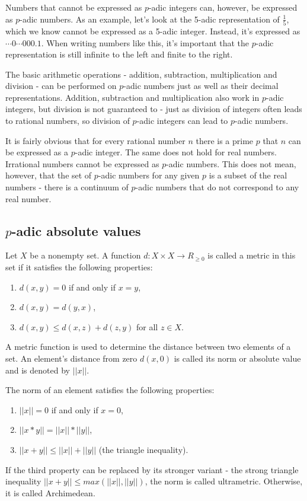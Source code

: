 \documentclass{llncs}
\begin{document}
Numbers that cannot be expressed as $p$-adic integers can, however, be expressed as $p$-adic numbers. As an example, let's look at the 5-adic representation of $\frac{1}{5}$, which we know cannot be expressed as a 5-adic integer. Instead, it's expressed as $\cdots 0 \cdots 000.1$. When writing numbers like this, it's important that the $p$-adic representation is still infinite to the left and finite to the right.

The basic arithmetic operations - addition, subtraction, multiplication and division - can be performed on $p$-adic numbers just as well as their decimal representations. Addition, subtraction and multiplication also work in $p$-adic integers, but division is not guaranteed to - just as division of integers often leads to rational numbers, so division of $p$-adic integers can lead to $p$-adic numbers.

It is fairly obvious that for every rational number $n$ there is a prime $p$ that $n$ can be expressed as a $p$-adic integer. The same does not hold for real numbers. Irrational numbers cannot be expressed as $p$-adic numbers. This does not mean, however, that the set of $p$-adic numbers for any given $p$ is a subset of the real numbers - there is a continuum of $p$-adic numbers that do not correspond to any real number. \cite{Rus12}
\subsection{$p$-adic absolute values}
Let $X$ be a nonempty set. A function $d: X \times X \rightarrow R_{\geq 0}$ is called a metric in this set if it satisfies the following properties:
\begin{enumerate}
\item $d(x,y) = 0$ if and only if $x = y$,\\
\item $d(x,y) = d(y,x)$,\\
\item $d(x,y) \leq d(x,z) + d(z,y)$ for all $z \in X$.
\end{enumerate}
A metric function is used to determine the distance between two elements of a set. An element's distance from zero $d(x,0)$ is called its norm or absolute value and is denoted by $||x||$.

The norm of an element satisfies the following properties:
\begin{enumerate}
\item $||x||=0$ if and only if $x=0$,\\
\item $||x*y|| = ||x||*||y||$,\\
\item $||x+y|| \leq ||x||+||y||$ (the triangle inequality).
\end{enumerate}
If the third property can be replaced by its stronger variant - the strong triangle inequality $||x+y|| \leq max(||x||,||y||)$, the norm is called ultrametric. Otherwise, it is called Archimedean. \cite{Rus12}
\end{document}
